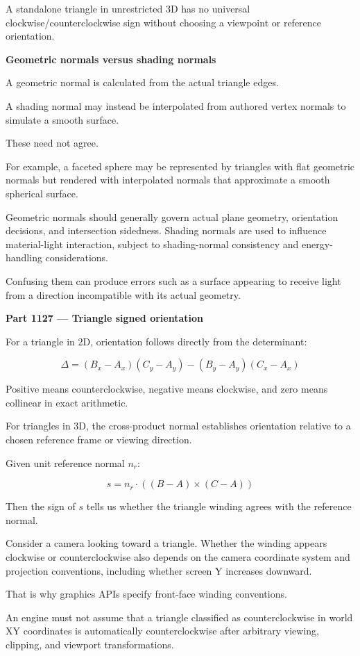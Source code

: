 A standalone triangle in unrestricted 3D has no universal clockwise/counterclockwise sign without choosing a viewpoint or reference orientation.

\textbf{Geometric normals versus shading normals}

A geometric normal is calculated from the actual triangle edges.

A shading normal may instead be interpolated from authored vertex normals to simulate a smooth surface.

These need not agree.

For example, a faceted sphere may be represented by triangles with flat geometric normals but rendered with interpolated normals that approximate a smooth spherical surface.

Geometric normals should generally govern actual plane geometry, orientation decisions, and intersection sidedness. Shading normals are used to influence material-light interaction, subject to shading-normal consistency and energy-handling considerations.

Confusing them can produce errors such as a surface appearing to receive light from a direction incompatible with its actual geometry.

\textbf{Part 1127 --- Triangle signed orientation}

For a triangle in 2D, orientation follows directly from the determinant:

\[
\Delta= (B_x-A_x)(C_y-A_y) - (B_y-A_y)(C_x-A_x)
\]

Positive means counterclockwise, negative means clockwise, and zero means collinear in exact arithmetic.

For triangles in 3D, the cross-product normal establishes orientation relative to a chosen reference frame or viewing direction.

Given unit reference normal \(n_r\):

\[
s=n_r\cdot((B-A)\times(C-A))
\]

Then the sign of \(s\) tells us whether the triangle winding agrees with the reference normal.

Consider a camera looking toward a triangle. Whether the winding appears clockwise or counterclockwise also depends on the camera coordinate system and projection conventions, including whether screen Y increases downward.

That is why graphics APIs specify front-face winding conventions.

An engine must not assume that a triangle classified as counterclockwise in world XY coordinates is automatically counterclockwise after arbitrary viewing, clipping, and viewport transformations.

